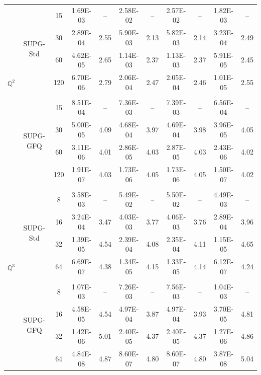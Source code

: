 \documentclass[a4paper,10pt]{article}
\begin{document}
\begin{table}[htbp]
\begin{tabular}{c |c |c|cc|cc|cc|cc}
		\multirow{8}{*}{$\mathbb{Q}^2$}
		& \multirow{4}{*}{SUPG-Std}
		& 15     & 1.69E-03 & --   & 2.58E-02 & --   & 2.57E-02 & --   & 1.82E-03 & --   \\[5pt]
		& & 30   & 2.89E-04 & 2.55 & 5.90E-03 & 2.13 & 5.82E-03 & 2.14 & 3.23E-04 & 2.49 \\[5pt]
		& & 60   & 4.62E-05 & 2.65 & 1.14E-03 & 2.37 & 1.13E-03 & 2.37 & 5.91E-05 & 2.45\\[5pt]
		& & 120  & 6.70E-06 & 2.79 & 2.06E-04 & 2.47 & 2.05E-04 & 2.46 & 1.01E-05 & 2.55\\[5pt]
		\cline{2-11}\\[3pt]
		& \multirow{4}{*}{SUPG-GFQ}
		&   15   & 8.51E-04 & --   & 7.36E-03 & --   & 7.39E-03 & --   & 6.56E-04 & --   \\[5pt]
		& & 30   & 5.00E-05 & 4.09 & 4.68E-04 & 3.97 & 4.69E-04 & 3.98 & 3.96E-05 & 4.05 \\[5pt]
		& & 60   & 3.11E-06 & 4.01 & 2.86E-05 & 4.03 & 2.87E-05 & 4.03 & 2.43E-06 & 4.02 \\[5pt]
		& & 120  & 1.91E-07 & 4.03 & 1.73E-06 & 4.05 & 1.73E-06 & 4.05 & 1.50E-07 & 4.02 \\[5pt]
		\hline\\[3pt]
		
		\multirow{8}{*}{$\mathbb{Q}^3$}
		& \multirow{4}{*}{SUPG-Std}
		&   8   & 3.58E-03 & --   & 5.49E-02 & --   & 5.50E-02 & --   & 4.49E-03 & --   \\[5pt]
		& & 16  & 3.24E-04 & 3.47 & 4.03E-03 & 3.77 & 4.06E-03 & 3.76 & 2.89E-04 & 3.96 \\[5pt]
		& & 32  & 1.39E-05 & 4.54 & 2.39E-04 & 4.08 & 2.35E-04 & 4.11 & 1.15E-05 & 4.65 \\[5pt]
		& & 64  & 6.69E-07 & 4.38 & 1.34E-05 & 4.15 & 1.33E-05 & 4.14 & 6.12E-07 & 4.24 \\[5pt]
		\cline{2-11}\\[3pt]
		& \multirow{4}{*}{SUPG-GFQ}
		&   8   & 1.07E-03 & --   & 7.26E-03 & --   & 7.56E-03 & --   & 1.04E-03 & --   \\[5pt]
		& & 16  & 4.58E-05 & 4.54 & 4.97E-04 & 3.87 & 4.97E-04 & 3.93 & 3.70E-05 & 4.81 \\[5pt]
		& & 32  & 1.42E-06 & 5.01 & 2.40E-05 & 4.37 & 2.40E-05 & 4.37 & 1.27E-06 & 4.86 \\[5pt]
		& & 64  & 4.84E-08 & 4.87 & 8.60E-07 & 4.80 & 8.60E-07 & 4.80 & 3.87E-08 & 5.04 \\[5pt]
		\hline
	\end{tabular}
\end{table}
\end{document}
